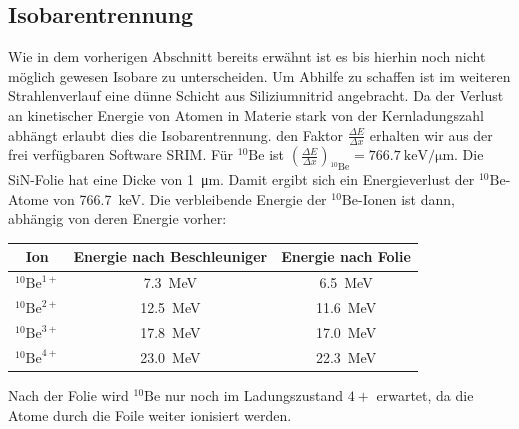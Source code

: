 \subsection{Isobarentrennung}
Wie in dem vorherigen Abschnitt bereits erwähnt ist es bis hierhin noch nicht möglich gewesen Isobare zu unterscheiden.
Um Abhilfe zu schaffen ist im weiteren Strahlenverlauf eine dünne Schicht aus Siliziumnitrid angebracht.
Da der Verlust an kinetischer Energie von Atomen in Materie stark von der Kernladungszahl abhängt erlaubt dies die Isobarentrennung.
den Faktor $\frac{\Delta E}{\Delta x}$ erhalten wir aus der frei verfügbaren Software SRIM.
Für $^{10}\text{Be}$ ist $\left (\frac{\Delta E}{\Delta x}\right )_{^{10}\text{Be}} = \SI{766.7}{\kilo\electronvolt\per\micro\metre}$.
Die SiN-Folie hat eine Dicke von \SI{1}{\micro\metre}.
Damit ergibt sich ein Energieverlust der $^{10}\text{Be}$-Atome von \SI{766.7}{\kilo\electronvolt}.
Die verbleibende Energie der $^{10}\text{Be}$-Ionen ist dann, abhängig von deren Energie vorher:
\begin{center}
  \begin{tabular}{|c|c|c|}
    \hline
    Ion & Energie nach Beschleuniger & Energie nach Folie \\
    \hline
    $^{10}\text{Be}^{1+}$ & \SI{7.3}{\mega\electronvolt}  & \SI{6.5}{\mega\electronvolt}  \\
    $^{10}\text{Be}^{2+}$ & \SI{12.5}{\mega\electronvolt} & \SI{11.6}{\mega\electronvolt} \\
    $^{10}\text{Be}^{3+}$ & \SI{17.8}{\mega\electronvolt} & \SI{17.0}{\mega\electronvolt} \\
    $^{10}\text{Be}^{4+}$ & \SI{23.0}{\mega\electronvolt} & \SI{22.3}{\mega\electronvolt} \\
    \hline
  \end{tabular}
  \label{Auswertung_tab_Ionenenergien_nach_Folie}
\end{center}
Nach der Folie wird $^{10}\text{Be}$ nur noch im Ladungszustand $4+$ erwartet, da die Atome durch die Foile weiter ionisiert werden.

